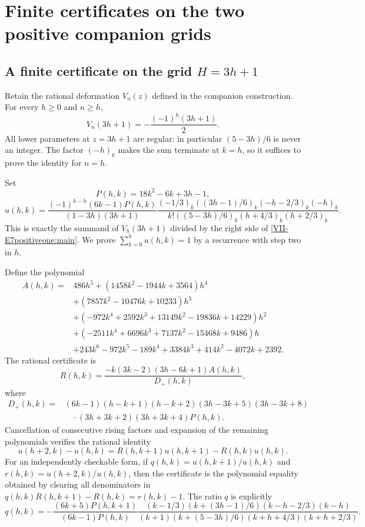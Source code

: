 \documentclass[11pt,letterpaper]{article}
\numberwithin{equation}{section}
\newcommand{\LocalAppendix}{\setcounter{section}{0}\setcounter{subsection}{0}\renewcommand{\thesection}{\Alph{section}}}
\begin{document}
\LocalAppendix
\section{Finite certificates on the two positive companion grids}\label{loc-VII-A}

\subsection{A finite certificate on the grid $H=3h+1$}
Retain the rational deformation $V_n(z)$ defined in the companion
construction. For every $h\ge0$ and $n\ge h$,
\begin{equation}\label{VII-E7positiveone:main}
 V_n(3h+1)=-\frac{(-1)^h(3h+1)}2.
\end{equation}
All lower parameters at $z=3h+1$ are regular: in particular
$(5-3h)/6$ is never an integer. The factor $(-h)_k$ makes the
sum terminate at $k=h$, so it suffices to prove the identity for $n=h$.

Set
\[
 P(h,k)=18k^2-6k+3h-1,
\]
\[
 u(h,k)=\frac{(-1)^{k-h}(6k-1)P(h,k)}{(1-3h)(3h+1)}
 \frac{(-1/3)_k((3h-1)/6)_k(-h-2/3)_k(-h)_k}
 {k!((5-3h)/6)_k(h+4/3)_k(h+2/3)_k}.
\]
This is exactly the summand of $V_h(3h+1)$ divided by the
right side of \eqref{VII-E7positiveone:main}. We prove
$\sum_{k=0}^hu(h,k)=1$ by a recurrence with step two in $h$.

Define the polynomial
\begin{align*}
 A(h,k)={}&486h^5+(1458k^2-1944k+3564)h^4\\
 &+(7857k^2-10476k+10233)h^3\\
 &+(-972k^4+2592k^3+13149k^2-19836k+14229)h^2\\
 &+(-2511k^4+6696k^3+7137k^2-15468k+9486)h\\
 &+243k^6-972k^5-189k^4+3384k^3+414k^2-4072k+2392.
\end{align*}
The rational certificate is
\[
 R(h,k)=\frac{-k(3k-2)(3h-6k+1)A(h,k)}{D_+(h,k)},
\]
where
\begin{align*}
 D_+(h,k)={}&(6k-1)(h-k+1)(h-k+2)(3h-3k+5)(3h-3k+8)\\
 &\quad\cdot(3h+3k+2)(3h+3k+4)P(h,k).
\end{align*}
Cancellation of consecutive rising factors and expansion of the
remaining polynomials verifies the rational identity
\begin{equation}\label{VII-E7positiveone:certificate}
 u(h+2,k)-u(h,k)
 =R(h,k+1)u(h,k+1)-R(h,k)u(h,k).
\end{equation}
For an independently checkable form, if
$q(h,k)=u(h,k+1)/u(h,k)$ and $r(h,k)=u(h+2,k)/u(h,k)$,
then the certificate is the polynomial equality obtained by clearing
all denominators in
$q(h,k)R(h,k+1)-R(h,k)=r(h,k)-1$.
The ratio $q$ is explicitly
\[
 q(h,k)=-\frac{(6k+5)P(h,k+1)}{(6k-1)P(h,k)}
 \frac{(k-1/3)(k+(3h-1)/6)(k-h-2/3)(k-h)}
 {(k+1)(k+(5-3h)/6)(k+h+4/3)(k+h+2/3)}.
\]
\end{document}
